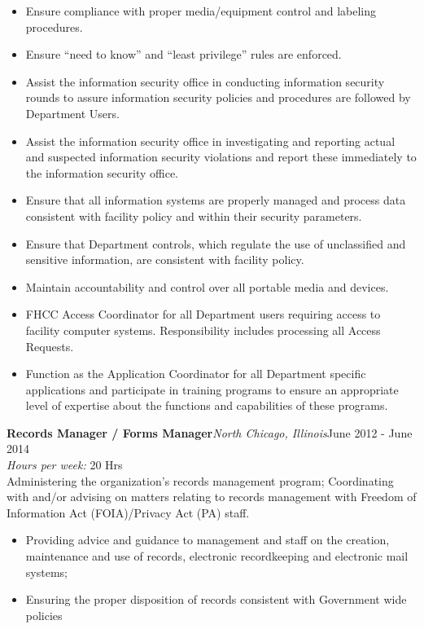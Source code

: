 \documentclass[a4papper,overlapped,line]{res}
\newcommand{\jobdes}[3]{{\bf \large #1\hspace{2ex}}{{\em \small #2}}{\hfill #3}}
\begin{document}
\begin{resume}
\begin{itemize}
	\item Ensure compliance with proper media/equipment control and labeling procedures.
	\item Ensure “need to know” and “least privilege” rules are enforced.
	\item Assist the information security office in conducting information security rounds to assure information security policies and procedures are followed by Department Users.
	\item Assist the information security office in investigating and reporting actual and suspected information security violations and report these immediately to the information security office.
	\item Ensure that all information systems are properly managed and process data consistent with facility policy and within their security parameters.
	\item Ensure that Department controls, which regulate the use of unclassified and sensitive information, are consistent with facility policy.
	\item Maintain accountability and control over all portable media and devices.
	\item FHCC Access Coordinator for all Department users requiring access to facility computer systems. Responsibility includes processing all Access Requests.
	\item Function as the Application Coordinator for all Department specific applications and participate in training programs to ensure an appropriate level of expertise about the functions and capabilities of these programs.
\end{itemize}
\jobdes{Records Manager / Forms Manager}{North Chicago, Illinois}{June 2012 - June 2014}\\
\textit{Hours per week:} 20 Hrs
\\
Administering the organization’s records management program; Coordinating with and/or
advising on matters relating to records management with Freedom of Information Act
(FOIA)/Privacy Act (PA) staff.
\\
\begin{itemize}
	\item Providing advice and guidance to management and staff on the creation, maintenance 
	and use of records, electronic recordkeeping and electronic mail systems; 
	\item Ensuring the proper disposition of records consistent with Government wide policies 

\end{itemize}
\end{resume}
\end{document}
